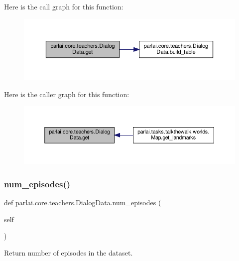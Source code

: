 Here is the call graph for this function\+:
\nopagebreak
\begin{figure}[H]
\begin{center}
\leavevmode
\includegraphics[width=350pt]{classparlai_1_1core_1_1teachers_1_1DialogData_a1e037df2f18a67503db657ae4cc27ab4_cgraph}
\end{center}
\end{figure}
Here is the caller graph for this function\+:
\nopagebreak
\begin{figure}[H]
\begin{center}
\leavevmode
\includegraphics[width=350pt]{classparlai_1_1core_1_1teachers_1_1DialogData_a1e037df2f18a67503db657ae4cc27ab4_icgraph}
\end{center}
\end{figure}
\mbox{\label{classparlai_1_1core_1_1teachers_1_1DialogData_a83e3457f29a54ec455ad76f7eab6cfc4}} 
\subsubsection{\texorpdfstring{num\+\_\+episodes()}{num\_episodes()}}
{\footnotesize\ttfamily def parlai.\+core.\+teachers.\+Dialog\+Data.\+num\+\_\+episodes (\begin{DoxyParamCaption}\item[{}]{self }\end{DoxyParamCaption})}

\begin{DoxyVerb}Return number of episodes in the dataset.\end{DoxyVerb}
 

